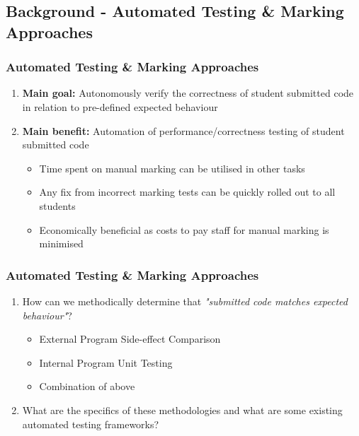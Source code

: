 \documentclass[xcolor]{beamer}
\begin{document}
\subsection{Background - Automated Testing \& Marking Approaches}
\begin{frame}
	\frametitle{Automated Testing \& Marking Approaches}
	\begin{enumerate}
		\setlength\itemsep{1em}
		\item \textbf{Main goal:} Autonomously verify the correctness of student submitted code in relation to pre-defined expected behaviour
			\pause
		\item \textbf{Main benefit:} Automation of performance/correctness testing of student submitted code
		\begin{itemize} 
			\item Time spent on manual marking can be utilised in other tasks
				\pause
			\item Any fix from incorrect marking tests can be quickly rolled out to all students 
				\pause
			\item Economically beneficial as costs to pay staff for manual marking is minimised 
		\end{itemize}
	\end{enumerate}
\end{frame}
\begin{frame}
	\frametitle{Automated Testing \& Marking Approaches}
	\begin{enumerate}
		\setlength\itemsep{1em}
		\item How can we methodically determine that \textit{"submitted code matches expected behaviour"}?
			\pause
		\begin{itemize} 
			\item External Program Side-effect Comparison
				\pause
			\item Internal Program Unit Testing
				\pause
			\item Combination of above
				\pause
		\end{itemize}
		\item What are the specifics of these methodologies and what are some existing automated testing frameworks?
	\end{enumerate}
\end{frame}
\end{document}
